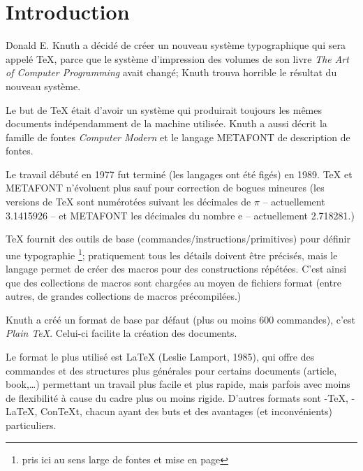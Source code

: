 
\chapter{Introduction}

Donald E. Knuth a décidé de créer un nouveau système typographique qui sera appelé \TeX{}, parce que le système d'impression des volumes de son livre \emph{The Art of Computer Programming} avait changé; Knuth trouva horrible le résultat du nouveau système.

Le but de \TeX{} était d'avoir un système qui produirait toujours les mêmes documents indépendamment de la machine utilisée. Knuth a aussi décrit la famille de fontes \emph{Computer Modern} et le langage \textsf{METAFONT} de description de fontes.

Le travail débuté en 1977 fut terminé (les langages ont été \og figés\fg) en 1989. \TeX{} et \textsf{METAFONT} n'évoluent plus sauf pour correction de bogues mineures (les versions de \TeX{} sont numérotées suivant les décimales de $\pi$ -- actuellement 3.1415926 -- et \textsf{METAFONT} les décimales du nombre \og e\fg{} -- actuellement 2.718281.)

\TeX{} fournit des outils de base (commandes/instructions/\og primitives\fg) pour définir une typographie \footnote{pris ici au sens large de fontes et mise en page}; pratiquement tous les détails doivent être précisés, mais le langage permet de créer des macros pour des constructions répétées. C'est ainsi que des collections de macros sont chargées au moyen de fichiers \og format\fg{} (entre autres, de grandes collections de macros précompilées.)

Knuth a créé un format de base par défaut (plus ou moins 600 commandes), c'est \emph{Plain \TeX}. Celui-ci facilite la création des documents.

Le format le plus utilisé est \LaTeX{} (Leslie Lamport, 1985), qui offre des commandes et des structures plus générales pour certains documents (article, book,\dots) permettant un travail plus facile et plus rapide, mais parfois avec moins de flexibilité à cause du cadre plus ou moins rigide. D'autres formats sont \AmS-\TeX{}, \AmS-\LaTeX, ConTeXt, chacun ayant des buts et des avantages (et inconvénients) particuliers.

